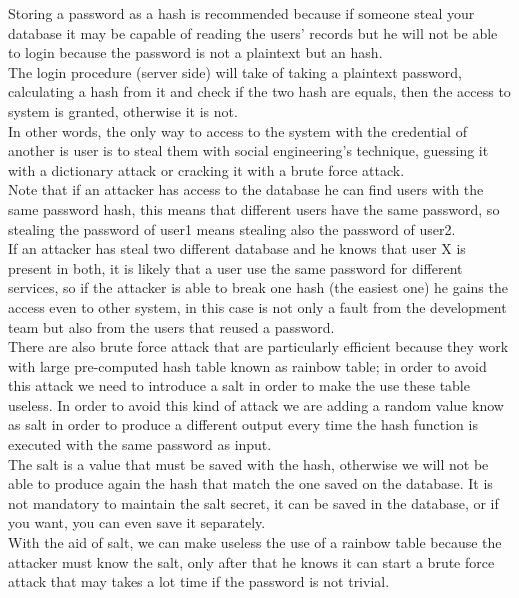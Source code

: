 Storing a password as a hash is recommended because if someone steal your database it may be capable of reading the users’ records but he will not be able to login because the password is not a plaintext but an hash.\\
The login procedure (server side) will take of taking a plaintext password, calculating a hash from it and check if the two hash are equals, then the access to system is granted, otherwise it is not.\\
In other words, the only way to access to the system with the credential of another is user is to steal them with social engineering’s technique, guessing it with a dictionary attack or cracking it with a brute force attack.\\
Note that if an attacker has access to the database he can find users with the same password hash, this means that different users have the same password, so stealing the password of user1 means stealing also the password of user2.\\
If an attacker has steal two different database and he knows that user X is present in both, it is likely that a user use the same password for different services, so if the attacker is able to break one hash (the easiest one) he gains the access even to other system, in this case is not only a fault from the development team but also from the users that reused a password.\\
There are also brute force attack that are particularly efficient because they work with large pre-computed hash table known as rainbow table; in order to avoid this attack we need to introduce a salt in order to make the use these table useless.
In order to avoid this kind of attack we are adding a random value know as salt in order to produce a different output every time the hash function is executed with the same password as input.\\
The salt is a value that must be saved with the hash, otherwise we will not be able to produce again the hash that match the one saved on the database.
It is not mandatory to maintain the salt secret, it can be saved in the database, or if you want, you can even save it separately.\\
With the aid of salt, we can make useless the use of a rainbow table because the attacker must know the salt, only after that he knows it can start a brute force attack that may takes a lot time if the password is not trivial.\\

